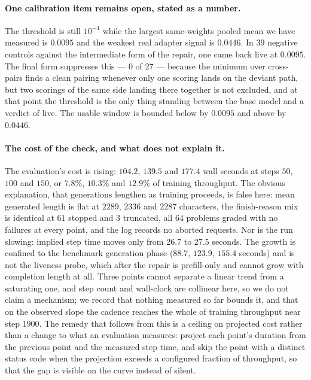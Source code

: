 \paragraph{One calibration item remains open, stated as a number.} The threshold is still
$10^{-4}$ while the largest same-weights pooled mean we have measured is $0.0095$ and the
weakest real adapter signal is $0.0446$. In $39$ negative controls against the intermediate
form of the repair, one came back live at $0.0095$. The final form suppresses this --- $0$ of
$27$ --- because the minimum over cross-pairs finds a clean pairing whenever only one scoring
lands on the deviant path, but two scorings of the same side landing there together is not
excluded, and at that point the threshold is the only thing standing between the base model and
a verdict of live. The usable window is bounded below by $0.0095$ and above by $0.0446$.

\paragraph{The cost of the check, and what does not explain it.} The evaluation's cost is
rising: $104.2$, $139.5$ and $177.4$ wall seconds at steps $50$, $100$ and $150$, or $7.8\%$,
$10.3\%$ and $12.9\%$ of training throughput. The obvious explanation, that generations lengthen
as training proceeds, is false here: mean generated length is flat at $2289$, $2336$ and $2287$
characters, the finish-reason mix is identical at $61$ stopped and $3$ truncated, all $64$
problems graded with no failures at every point, and the log records no aborted requests. Nor
is the run slowing: implied step time moves only from $26.7$ to $27.5$ seconds. The growth is
confined to the benchmark generation phase ($88.7$, $123.9$, $155.4$ seconds) and is not the
liveness probe, which after the repair is prefill-only and cannot grow with completion length
at all. Three points cannot separate a linear trend from a saturating one, and step count and
wall-clock are collinear here, so we do not claim a mechanism; we record that nothing measured
so far bounds it, and that on the observed slope the cadence reaches the whole of training
throughput near step $1900$. The remedy that follows from this is a ceiling on projected cost
rather than a change to what an evaluation measures: project each point's duration from the
previous point and the measured step time, and skip the point with a distinct status code when
the projection exceeds a configured fraction of throughput, so that the gap is visible on the
curve instead of silent.

